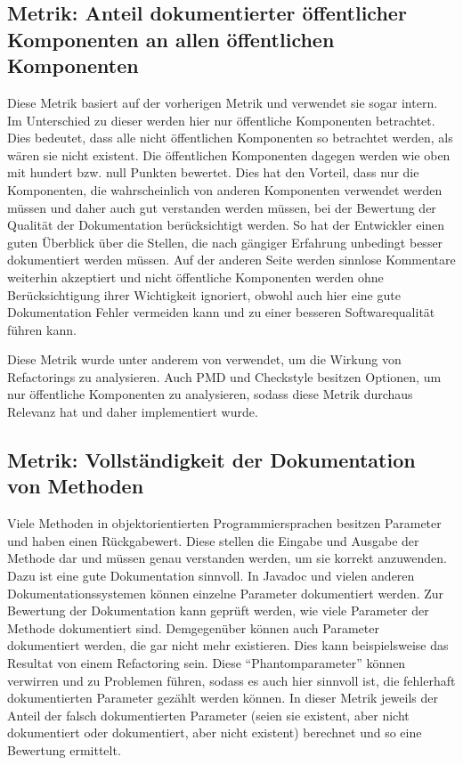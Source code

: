\subsection{Metrik: Anteil dokumentierter öffentlicher Komponenten an allen öffentlichen Komponenten }\label{chapter:public_members}
Diese Metrik basiert auf der vorherigen Metrik und verwendet sie sogar intern. Im Unterschied zu dieser werden hier nur öffentliche Komponenten betrachtet. Dies bedeutet, dass alle nicht öffentlichen Komponenten so betrachtet werden, als wären sie nicht existent. Die öffentlichen Komponenten dagegen werden wie oben mit hundert bzw. null Punkten bewertet. Dies hat den Vorteil, dass nur die Komponenten, die wahrscheinlich von anderen Komponenten verwendet werden müssen und daher auch gut verstanden werden müssen, bei der Bewertung der Qualität der Dokumentation berücksichtigt werden. So hat der Entwickler einen guten Überblick über die Stellen, die nach gängiger Erfahrung unbedingt besser dokumentiert werden müssen. Auf der anderen Seite werden sinnlose Kommentare weiterhin akzeptiert und nicht öffentliche Komponenten werden ohne Berücksichtigung ihrer Wichtigkeit ignoriert, obwohl auch hier eine gute Dokumentation Fehler vermeiden kann und zu einer besseren Softwarequalität führen kann. 

Diese Metrik wurde unter anderem von \cite{Doautomaticrefactoringsimprovemaintainability?Anindustrialcasestudy} verwendet, um die Wirkung von Refactorings zu analysieren. Auch PMD und Checkstyle besitzen Optionen, um nur öffentliche Komponenten zu analysieren, sodass diese Metrik durchaus Relevanz hat und daher implementiert wurde.

 
 \subsection{Metrik: Vollständigkeit der Dokumentation von  Methoden}\label{chapter:method_doc}
 
Viele Methoden in objektorientierten Programmiersprachen besitzen Parameter und haben einen Rückgabewert. Diese stellen die Eingabe und Ausgabe der Methode dar und müssen genau verstanden werden, um sie korrekt anzuwenden. Dazu ist eine gute Dokumentation sinnvoll. In Javadoc und vielen anderen Dokumentationssystemen können einzelne Parameter dokumentiert werden. Zur Bewertung der Dokumentation kann geprüft werden, wie viele Parameter der Methode dokumentiert sind. Demgegenüber können auch Parameter dokumentiert werden, die gar nicht mehr existieren. Dies kann beispielsweise das Resultat von einem Refactoring sein. Diese \enquote{Phantomparameter} können verwirren und zu Problemen führen, sodass es auch hier sinnvoll ist, die fehlerhaft dokumentierten Parameter gezählt werden können. In dieser Metrik jeweils der Anteil der falsch dokumentierten Parameter (seien sie existent, aber nicht dokumentiert oder dokumentiert, aber nicht existent) berechnet und so eine Bewertung ermittelt.
 
